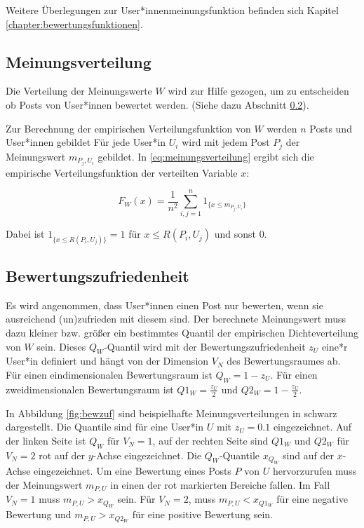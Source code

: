 Weitere Überlegungen zur User*innenmeinungsfunktion befinden sich Kapitel \ref{chapter:bewertungsfunktionen}.

\subsection{Meinungsverteilung}

Die Verteilung der Meinungswerte $W$ wird zur Hilfe gezogen, um zu entscheiden ob Posts von User*innen bewertet werden. (Siehe dazu Abschnitt \ref{bewertungszufriedenheit}).

Zur Berechnung der empirischen Verteilungsfunktion von $W$ werden $n$ Posts und User*innen gebildet Für jede User*in $U_i$ wird mit jedem Post $P_j$ der Meinungswert $m_{P_j, U_i}$ gebildet. In \ref{eq:meinungsverteilung} ergibt sich die empirische Verteilungsfunktion der verteilten Variable $x$:

\begin{equation}
\label{eq:meinungsverteilung}
F_W(x) = \frac{1}{n^2}\sum_{i,j = 1}^{n} 1_{\{x \leq m_{P_j, U_i}\}}
\end{equation}

Dabei ist  $1_{\{x \leq R(P_i,U_j)\}} = 1$ für $x \leq R(P_i,U_j)$ und sonst $0$.


\subsection{Bewertungszufriedenheit}
\label{bewertungszufriedenheit}

Es wird angenommen, dass User*innen einen Post nur bewerten, wenn sie ausreichend (un)zufrieden mit diesem sind. Der berechnete Meinungswert muss dazu kleiner bzw. größer ein bestimmtes Quantil der empirischen Dichteverteilung von $W$ sein. Dieses $Q_W$-Quantil wird mit der Bewertungszufriedenheit $z_U$ eine*r User*in definiert und hängt von der Dimension $V_N$ des Bewertungsraumes ab. Für einen eindimensionalen Bewertungsraum ist $Q_W = 1 - z_U$. Für einen zweidimensionalen Bewertungsraum ist $Q1_W = \frac{z_U}{2}$ und $Q2_W = 1 - \frac{z_U}{2}$.

In Abbildung \ref{fig:bewzuf} sind beispielhafte Meinungsverteilungen in schwarz dargestellt. Die Quantile sind für eine User*in $U$ mit $z_U = 0.1$ eingezeichnet. Auf der linken Seite ist $Q_W$ für $V_N = 1$, auf der rechten Seite sind $Q1_W$ und $Q2_W$ für $V_N = 2$ rot auf der $y$-Achse eingezeichnet. Die $Q_W$-Quantile $x_{Q_W}$ sind auf der $x$-Achse eingezeichnet. Um eine Bewertung eines Posts $P$ von $U$ hervorzurufen muss der Meinungswert $m_{P,U}$ in einen der rot markierten Bereiche fallen. Im Fall $V_N = 1$ muss $m_{P,U} > x_{Q_W}$ sein. Für $V_N = 2$, muss $m_{P,U} < x_{Q1_W}$ für eine negative Bewertung und $m_{P,U} > x_{Q2_W}$ für eine positive Bewertung sein.

